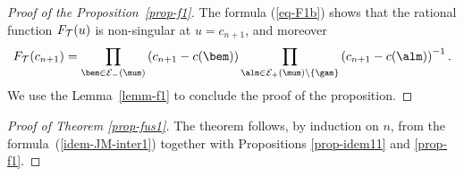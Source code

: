 \begin{proof}[Proof of the Proposition~\ref{prop-f1}] The formula (\ref{eq-F1b}) shows that the rational function $F_{{\cal{T}}}(u)$ is non-singular at $u=c_{n+1}$, and moreover
\begin{gather*}
F_{{\cal{T}}}(c_{n+1})= \prod_{\bem\in {\cal{E}}_-(\mum)}\left(c_{n+1}-c(\bem)\right)\prod_{\alm\in {\cal{E}}_+(\mum)\backslash\{\gam\}}\left(c_{n+1}-c(\alm)\right)^{-1} .
\end{gather*}
We use the Lemma~\ref{lemm-f1} to conclude the proof of the proposition.
\end{proof}


\begin{proof}[Proof of Theorem  \ref{prop-fus1}]
 The theorem follows, by induction on $n$, from the formula~(\ref{idem-JM-inter1}) together with Propositions \ref{prop-idem11} and \ref{prop-f1}.
\end{proof}
